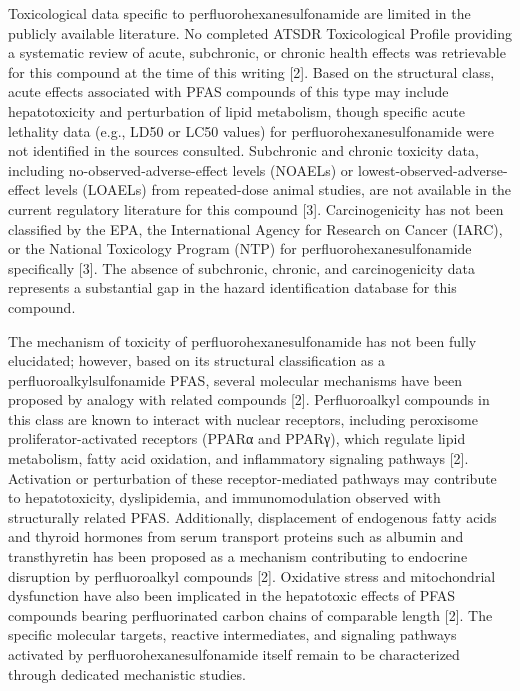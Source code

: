Toxicological data specific to perfluorohexanesulfonamide are limited in the publicly available literature. No completed ATSDR Toxicological Profile providing a systematic review of acute, subchronic, or chronic health effects was retrievable for this compound at the time of this writing [2]. Based on the structural class, acute effects associated with PFAS compounds of this type may include hepatotoxicity and perturbation of lipid metabolism, though specific acute lethality data (e.g., LD50 or LC50 values) for perfluorohexanesulfonamide were not identified in the sources consulted. Subchronic and chronic toxicity data, including no-observed-adverse-effect levels (NOAELs) or lowest-observed-adverse-effect levels (LOAELs) from repeated-dose animal studies, are not available in the current regulatory literature for this compound [3]. Carcinogenicity has not been classified by the EPA, the International Agency for Research on Cancer (IARC), or the National Toxicology Program (NTP) for perfluorohexanesulfonamide specifically [3]. The absence of subchronic, chronic, and carcinogenicity data represents a substantial gap in the hazard identification database for this compound.

The mechanism of toxicity of perfluorohexanesulfonamide has not been fully elucidated; however, based on its structural classification as a perfluoroalkylsulfonamide PFAS, several molecular mechanisms have been proposed by analogy with related compounds [2]. Perfluoroalkyl compounds in this class are known to interact with nuclear receptors, including peroxisome proliferator-activated receptors (PPARα and PPARγ), which regulate lipid metabolism, fatty acid oxidation, and inflammatory signaling pathways [2]. Activation or perturbation of these receptor-mediated pathways may contribute to hepatotoxicity, dyslipidemia, and immunomodulation observed with structurally related PFAS. Additionally, displacement of endogenous fatty acids and thyroid hormones from serum transport proteins such as albumin and transthyretin has been proposed as a mechanism contributing to endocrine disruption by perfluoroalkyl compounds [2]. Oxidative stress and mitochondrial dysfunction have also been implicated in the hepatotoxic effects of PFAS compounds bearing perfluorinated carbon chains of comparable length [2]. The specific molecular targets, reactive intermediates, and signaling pathways activated by perfluorohexanesulfonamide itself remain to be characterized through dedicated mechanistic studies.

